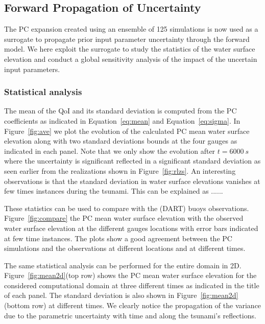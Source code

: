 \subsection{Forward Propagation of Uncertainty}
\label{sec:forward}
The PC expansion created using an ensemble of 125 \geoclaw simulations
is now used as a surrogate to propagate prior input parameter uncertainty 
through the forward model. We here exploit the surrogate 
to study the statistics of the water surface elevation and conduct 
a global sensitivity analysis of the impact of the uncertain input parameters.

\subsubsection{Statistical analysis}
The mean of the QoI and its standard deviation is computed
from the PC coefficients as indicated in Equation~\eqref{eq:mean} and Equation~\eqref{eq:sigma}. 
In Figure~\ref{fig:ave} we plot the evolution of
the calculated PC mean water surface elevation along with two standard deviations
bounds at the four gauges as indicated in each panel.  
Note that we only show the evolution after $t=6000~s$ where the uncertainty is significant
reflected in a significant standard deviation as seen earlier from the realizations shown 
in Figure~\ref{fig:rlzs}. An interesting observations is that the
standard deviation in water surface elevations vanishes at few times instances
during the tsunami. \alert{This can be explained as ...... }

These statistics can be used to compare with the 
(DART) buoys observations. Figure~\ref{fig:compare} 
the PC mean water surface elevation with the observed 
water surface elevation at the different gauges locations
with error bars indicated at few time instances. 
The plots show a good agreement between the PC simulations and the 
observations at different locations and at different times. 

The same statistical analysis can be performed for the
entire domain in 2D. Figure~\ref{fig:mean2d}(top row) shows
the PC mean water surface elevation for the considered computational
domain at three different times as indicated in the title of each panel.
The standard deviation is also shown in Figure~\ref{fig:mean2d}(bottom row)
at different times. We clearly notice the propagation of the variance
due to the parametric uncertainty with time
and along the tsunami's reflections. 

        
